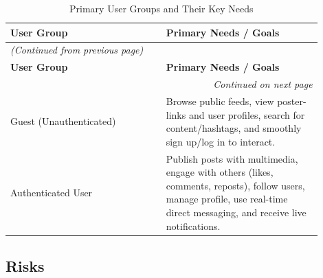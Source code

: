 \begin{longtable}{|p{0.45\linewidth}|p{0.45\linewidth}|}
\caption{Primary User Groups and Their Key Needs} \label{tab:2} \\
\hline
\textbf{User Group} & \textbf{Primary Needs / Goals} \\
\hline
\endfirsthead
\multicolumn{2}{l}{\textit{(Continued from previous page)}} \\
\hline
\textbf{User Group} & \textbf{Primary Needs / Goals} \\
\hline
\endhead
\hline \multicolumn{2}{r}{\textit{Continued on next page}} \\
\endfoot
\hline
\endlastfoot
Guest (Unauthenticated) & Browse public feeds, view poster-links and user profiles, search for content/hashtags, and smoothly sign up/log in to interact. \\
\hline
Authenticated User & Publish posts with multimedia, engage with others (likes, comments, reposts), follow users, manage profile, use real-time direct messaging, and receive live notifications. \\
\hline
\end{longtable}


\subsection{Risks}


